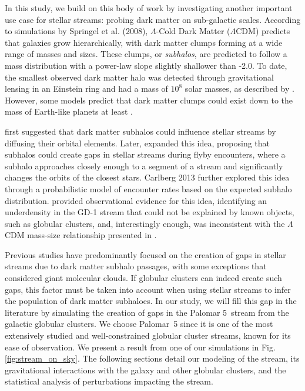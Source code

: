 \documentclass{aa}
\begin{document}
  In this study, we build on this body of work by investigating another important use case for stellar streams: probing dark matter on sub-galactic scales. According to simulations by Springel et al. (2008), $\Lambda$-Cold Dark Matter ($\Lambda$CDM) predicts that galaxies grow hierarchically, with dark matter clumps forming at a wide range of masses and sizes. These clumps, or \textit{subhalos}, are predicted to follow a mass distribution with a power-law slope slightly shallower than -2.0. To date, the smallest observed dark matter halo was detected through gravitational lensing in an Einstein ring and had a mass of $10^8$ solar masses, as described by \citet{2012Natur.481..341V}. However, some models predict that dark matter clumps could exist down to the mass of Earth-like planets at least \citep[see][ and discussion in \citet{2021arXiv211101148A}]{2005JCAP...08..003G, wang20}. 

  \citet{2002MNRAS.332..915I} first suggested that dark matter subhalos could influence stellar streams by diffusing their orbital elements. Later, \citet{2012ApJ...748...20C} expanded this idea, proposing that subhalos could create gaps in stellar streams during flyby encounters, where a subhalo approaches closely enough to a segment of a stream and significantly changes the orbits of the closest stars. Carlberg 2013 further explored this idea through a probabilistic model of encounter rates based on the expected subhalo distribution. \citet{2019ApJ...880...38B} provided observational evidence for this idea, identifying an underdensity in the GD-1 stream that could not be explained by known objects, such as globular clusters, and, interestingly enough, was inconsistent with the $\Lambda$CDM mass-size relationship presented in \cite{2017MNRAS.466.4974M}.

  Previous studies have predominantly focused on the creation of gaps in stellar streams due to dark matter subhalo passages, with some exceptions that considered giant molecular clouds. If globular clusters can indeed create such gaps, this factor must be taken into account when using stellar streams to infer the population of dark matter subhaloes. In our study, we will fill this gap in the literature by simulating the creation of gaps in the Palomar 5~stream from the galactic globular clusters. We choose Palomar~5 since it is one of the most extensively studied and well-constrained globular cluster streams, known for its ease of observation. We present a result from one of our simulations in Fig. \ref{fig:stream_on_sky}. The following sections detail our modeling of the stream, its gravitational interactions with the galaxy and other globular clusters, and the statistical analysis of perturbations impacting the stream.
\end{document}
